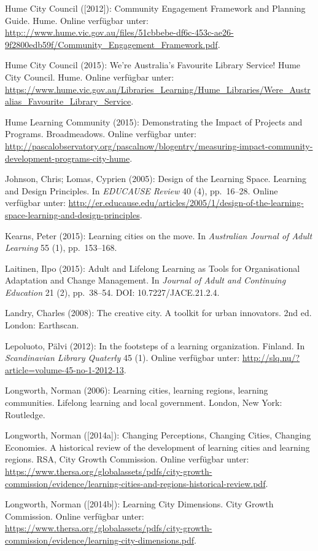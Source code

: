 \documentclass[a4paper,
fontsize=11pt,
oneside,
numbers=noperiodatend,
parskip=half-,
bibliography=totoc,
final
]{scrartcl}
\begin{document}
Hume City Council ({[}2012{]}): Community Engagement Framework and
Planning Guide. Hume. Online verfügbar unter:
\url{http:://www.hume.vic.gov.au/files/51cbbebe-df6c-453c-ae26-9f2800edb59f/Community_Engagement_Framework.pdf}.

Hume City Council (2015): We're Australia's Favourite Library Service!
Hume City Council. Hume. Online verfügbar unter:
\url{https://www.hume.vic.gov.au/Libraries_Learning/Hume_Libraries/Were_Australias_Favourite_Library_Service}.

Hume Learning Community (2015): Demonstrating the Impact of Projects and
Programs. Broadmeadows. Online verfügbar unter:
\url{http://pascalobservatory.org/pascalnow/blogentry/measuring-impact-community-development-programs-city-hume}.

Johnson, Chris; Lomas, Cyprien (2005): Design of the Learning Space.
Learning and Design Principles. In \emph{EDUCAUSE Review} 40 (4),
pp.~16--28. Online verfügbar unter:
\url{http://er.educause.edu/articles/2005/1/design-of-the-learning-space-learning-and-design-principles}.

Kearns, Peter (2015): Learning cities on the move. In \emph{Australian
Journal of Adult Learning} 55 (1), pp.~153--168.

Laitinen, Ilpo (2015): Adult and Lifelong Learning as Tools for
Organisational Adaptation and Change Management. In \emph{Journal of
Adult and Continuing Education} 21 (2), pp.~38--54. DOI:
10.7227/JACE.21.2.4.

Landry, Charles (2008): The creative city. A toolkit for urban
innovators. 2nd ed. London: Earthscan.

Lepoluoto, Pälvi (2012): In the footsteps of a learning organization.
Finland. In \emph{Scandinavian Library Quaterly} 45 (1). Online
verfügbar unter: \url{http://slq.nu/?article=volume-45-no-1-2012-13}.

Longworth, Norman (2006): Learning cities, learning regions, learning
communities. Lifelong learning and local government. London, New York:
Routledge.

Longworth, Norman ({[}2014a{]}): Changing Perceptions, Changing Cities,
Changing Economies. A historical review of the development of learning
cities and learning regions. RSA, City Growth Commission. Online
verfügbar unter:
\url{https://www.thersa.org/globalassets/pdfs/city-growth-commission/evidence/learning-cities-and-regions-historical-review.pdf}.

Longworth, Norman ({[}2014b{]}): Learning City Dimensions. City Growth
Commission. Online verfügbar unter:
\url{https://www.thersa.org/globalassets/pdfs/city-growth-commission/evidence/learning-city-dimensions.pdf}.
\end{document}
